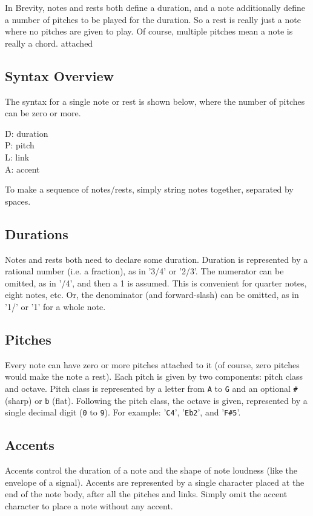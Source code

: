 \documentclass{scrartcl}
\begin{document}
In Brevity, notes and rests both define a duration, and a note additionally define a number of pitches to be played for the duration. So a rest is really just a note where no pitches are given to play. Of course, multiple pitches mean a note is really a chord.
attached
\subsection{Syntax Overview}
The syntax for a single note or rest is shown below, where the number of pitches can be zero or more.
\begin{center}
   
\end{center}
\begin{tabbing}
  \hspace{1.85in}\= D: duration \\
  \> P: pitch \\
  \> L: link \\
  \> A: accent \\
\end{tabbing}
To make a sequence of notes/rests, simply string notes together, separated by spaces.

\subsection{Durations}
Notes and rests both need to declare some duration. Duration is represented by a rational number (i.e. a fraction), as in '3/4' or '2/3'. The numerator can be omitted, as in '/4', and then a 1 is assumed. This is convenient for quarter notes, eight notes, etc. Or, the denominator (and forward-slash) can be omitted, as in '1/' or '1' for a whole note.

\subsection{Pitches}
Every note can have zero or more pitches attached to it (of course, zero pitches would make the note a rest). Each pitch is given by two components: pitch class and octave. Pitch class is represented by a letter from \verb|A| to \verb|G| and an optional \verb|#| (sharp) or \verb|b| (flat). Following the pitch class, the octave is given, represented by a single decimal digit (\verb|0| to \verb|9|). For example: '\verb|C4|', '\verb|Eb2|', and '\verb|F#5|'.

\subsection{Accents}
Accents control the duration of a note and the shape of note loudness (like the envelope of a signal). Accents are represented by a single character placed at the end of the note body, after all the pitches and links. Simply omit the accent character to place a note without any accent.
\end{document}
